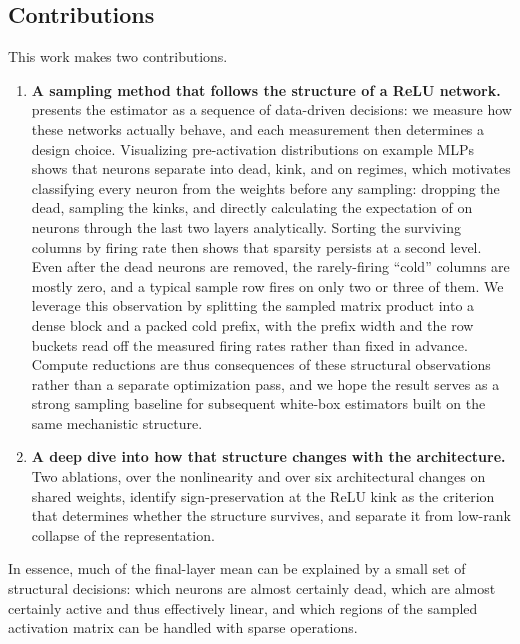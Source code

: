 \subsection{Contributions}

This work makes two contributions.

\begin{enumerate}[leftmargin=*]
    \item \textbf{A sampling method that follows the structure of a ReLU network.}  presents the estimator as a sequence of data-driven decisions: we measure how these networks actually behave, and each measurement then determines a design choice. Visualizing pre-activation distributions on example MLPs shows that neurons separate into dead, kink, and on regimes, which motivates classifying every neuron from the weights before any sampling: dropping the dead, sampling the kinks, and directly calculating the expectation of on neurons through the last two layers analytically. Sorting the surviving columns by firing rate then shows that sparsity persists at a second level. Even after the dead neurons are removed, the rarely-firing ``cold'' columns are mostly zero, and a typical sample row fires on only two or three of them. We leverage this observation by splitting the sampled matrix product into a dense block and a packed cold prefix, with the prefix width and the row buckets read off the measured firing rates rather than fixed in advance. Compute reductions are thus consequences of these structural observations rather than a separate optimization pass, and we hope the result serves as a strong sampling baseline for subsequent white-box estimators built on the same mechanistic structure.
    \item \textbf{A deep dive into how that structure changes with the architecture.} Two ablations, over the nonlinearity and over six architectural changes on shared weights, identify sign-preservation at the ReLU kink as the criterion that determines whether the structure survives, and separate it from low-rank collapse of the representation.
\end{enumerate}

In essence, much of the final-layer mean can be explained by a small set of structural decisions: which neurons are almost certainly dead, which are almost certainly active and thus effectively linear, and which regions of the sampled activation matrix can be handled with sparse operations.